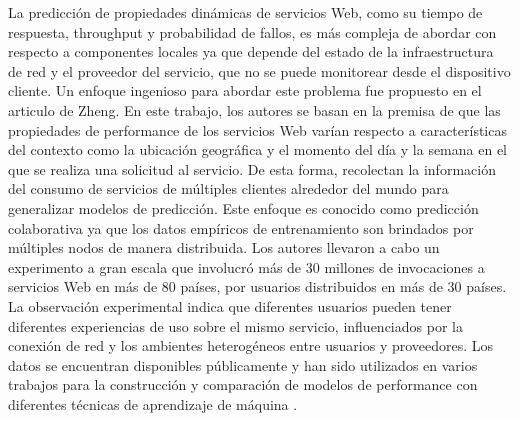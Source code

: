 La predicción de propiedades dinámicas de servicios Web, como su tiempo
de respuesta, throughput y probabilidad de fallos, es más compleja
de abordar con respecto a componentes locales ya que depende del estado
de la infraestructura de red y el proveedor del servicio, que no se
puede monitorear desde el dispositivo cliente. Un enfoque ingenioso
para abordar este problema fue propuesto en el articulo de Zheng\citep{Zheng2013}.
En este trabajo, los autores se basan en la premisa de que las propiedades
de performance de los servicios Web varían respecto a características
del contexto como la ubicación geográfica y el momento del día y la
semana en el que se realiza una solicitud al servicio. De esta forma,
recolectan la información del consumo de servicios de múltiples clientes
alrededor del mundo para generalizar modelos de predicción. Este enfoque
es conocido como predicción colaborativa ya que los datos empíricos
de entrenamiento son brindados por múltiples nodos de manera distribuida.
Los autores llevaron a cabo un experimento a gran escala que involucró
más de 30 millones de invocaciones a servicios Web en más de 80 países,
por usuarios distribuidos en más de 30 países. La observación experimental
indica que diferentes usuarios pueden tener diferentes experiencias
de uso sobre el mismo servicio, influenciados por la conexión de red
y los ambientes heterogéneos entre usuarios y proveedores. Los datos
se encuentran disponibles públicamente y han sido utilizados en varios
trabajos para la construcción y comparación de modelos de performance
con diferentes técnicas de aprendizaje de máquina \citep{Albu2013}\citep{Kumar2015}. 

